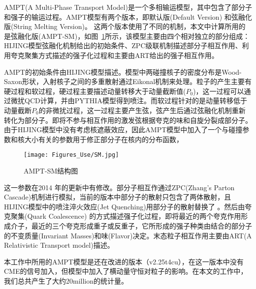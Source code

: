   \vspace{0.1cm}
  AMPT(A Multi-Phase Transport Model)是一个多相输运模型，其中包含了部分子和强子的输运过程。AMPT模型有两个版本，即默认版(Default Version) 和弦融化版(String Melting Version)。 这两个版本使用了不同的机制，本文中计算所用的是弦融化版(AMPT-SM)，如图~\ref{Fig:AMPT}所示，该模型主要由四个相对独立的部分组成：HIJING模型弦融化机制给出的初始条件、ZPC级联机制描述部分子相互作用、利用夸克聚集方式描述的强子化过程和主要由ART给出的强子相互作用\cite{lin2005multiphase,lin2014recent}。

  AMPT的初始条件由HIJING模型描述。模型中两碰撞核子的密度分布是Wood-Saxon形状，入射核子之间的多重散射通过Eikonal机制来处理。粒子的产生主要有硬过程和软过程，硬过程主要描述动量转移大于动量截断值($P_0$)，这一过程可以通过微扰QCD计算，并由PYTHIA模型得到喷注。而软过程针对的是动量转移低于动量截断$P_0$的非微扰过程，这一过程主要产生弦，弦产生后通过弦融化机制重新转化为部分子。即将不参与相互作用的激发弦根据夸克的味和自旋分裂成部分子\cite{lin2005multiphase}。由于HIJING模型中没有考虑核遮蔽效应，因此AMPT模型中加入了一个与碰撞参数和核大小有关的参数用于修正部分子在核内的分布函数，
    \begin{figure}[!htbp]
    \centering
    \texttt{[image: Figures\_Use/SM.jpg]}
    \caption{AMPT-SM结构图\cite{lin2005multiphase}}
    \label{Fig:AMPT}
    \end{figure}
 这一参数在2014 年的更新中有修改\cite{lin2014recent}。部分子相互作通过ZPC(Zhang's Parton Cascade)机制进行模拟，当前的版本中部分子的散射只包含了两体散射，且HIJING模型中的喷注淬火效应(Jet Quenching)用部分子的散射替换了 。然后由夸克聚集(Quark Coalescence) 的方式描述强子化过程，即将最近的两个夸克作用形成介子，最近的三个夸克形成重子或反重子，它所形成的强子种类由结合的部分子的不变质量(Invariant Masses)和味(Flavor)决定。末态粒子相互作用主要由ART(A Relativistic Transport model)描述。

本工作中所用的AMPT模型是还在改进的版本（v2.25t4cu），在这一版本中没有CME的信号加入，但模型中加入了横动量守恒对粒子的影响。在本文的工作中，我们总共产生了大约20million的统计量。 


